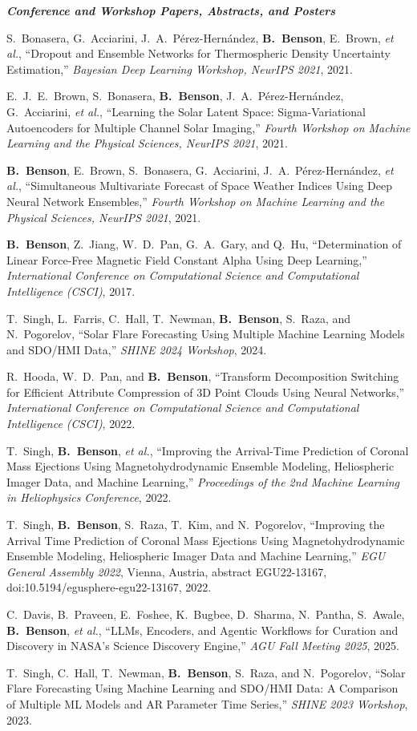 \documentclass[11pt,letterpaper]{article}
\newcommand{\me}{\textbf{B.~Benson}}
\begin{document}
\vspace{0.6ex}
\textbf{\itshape Conference and Workshop Papers, Abstracts, and Posters}
\begin{pubs}
  \item S.~Bonasera, G.~Acciarini, J.~A.~P\'erez-Hern\'andez, \me, E.~Brown, \textit{et al.}, ``Dropout and Ensemble Networks for Thermospheric Density Uncertainty Estimation,'' \textit{Bayesian Deep Learning Workshop, NeurIPS 2021}, 2021.
  \item E.~J.~E.~Brown, S.~Bonasera, \me, J.~A.~P\'erez-Hern\'andez, G.~Acciarini, \textit{et al.}, ``Learning the Solar Latent Space: Sigma-Variational Autoencoders for Multiple Channel Solar Imaging,'' \textit{Fourth Workshop on Machine Learning and the Physical Sciences, NeurIPS 2021}, 2021.
  \item \me, E.~Brown, S.~Bonasera, G.~Acciarini, J.~A.~P\'erez-Hern\'andez, \textit{et al.}, ``Simultaneous Multivariate Forecast of Space Weather Indices Using Deep Neural Network Ensembles,'' \textit{Fourth Workshop on Machine Learning and the Physical Sciences, NeurIPS 2021}, 2021.
  \item \me, Z.~Jiang, W.~D.~Pan, G.~A.~Gary, and Q.~Hu, ``Determination of Linear Force-Free Magnetic Field Constant Alpha Using Deep Learning,'' \textit{International Conference on Computational Science and Computational Intelligence (CSCI)}, 2017.
  \item T.~Singh, L.~Farris, C.~Hall, T.~Newman, \me, S.~Raza, and N.~Pogorelov, ``Solar Flare Forecasting Using Multiple Machine Learning Models and SDO/HMI Data,'' \textit{SHINE 2024 Workshop}, 2024.
  \item R.~Hooda, W.~D.~Pan, and \me, ``Transform Decomposition Switching for Efficient Attribute Compression of 3D Point Clouds Using Neural Networks,'' \textit{International Conference on Computational Science and Computational Intelligence (CSCI)}, 2022.
  \item T.~Singh, \me, \textit{et al.}, ``Improving the Arrival-Time Prediction of Coronal Mass Ejections Using Magnetohydrodynamic Ensemble Modeling, Heliospheric Imager Data, and Machine Learning,'' \textit{Proceedings of the 2nd Machine Learning in Heliophysics Conference}, 2022.
  \item T.~Singh, \me, S.~Raza, T.~Kim, and N.~Pogorelov, ``Improving the Arrival Time Prediction of Coronal Mass Ejections Using Magnetohydrodynamic Ensemble Modeling, Heliospheric Imager Data and Machine Learning,'' \textit{EGU General Assembly 2022}, Vienna, Austria, abstract EGU22-13167, doi:10.5194/egusphere-egu22-13167, 2022.
  \item C.~Davis, B.~Praveen, E.~Foshee, K.~Bugbee, D.~Sharma, N.~Pantha, S.~Awale, \me, \textit{et al.}, ``LLMs, Encoders, and Agentic Workflows for Curation and Discovery in NASA's Science Discovery Engine,'' \textit{AGU Fall Meeting 2025}, 2025.
  \item T.~Singh, C.~Hall, T.~Newman, \me, S.~Raza, and N.~Pogorelov, ``Solar Flare Forecasting Using Machine Learning and SDO/HMI Data: A Comparison of Multiple ML Models and AR Parameter Time Series,'' \textit{SHINE 2023 Workshop}, 2023.
\end{pubs}
\end{document}
